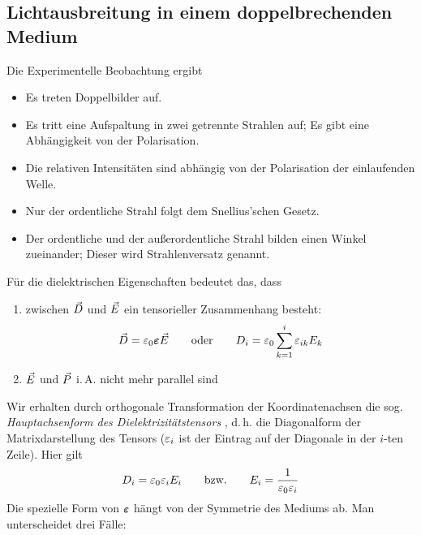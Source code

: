 \subsection{Lichtausbreitung in einem doppelbrechenden Medium}
Die Experimentelle Beobachtung ergibt
\begin{itemize}
\item Es treten Doppelbilder auf.
\item Es tritt eine Aufspaltung in zwei getrennte Strahlen auf; Es
  gibt eine Abhängigkeit von der Polarisation.
\item Die relativen Intensitäten sind abhängig von der Polarisation
  der einlaufenden Welle.
\item Nur der ordentliche Strahl folgt dem Snellius'schen Gesetz.
\item Der ordentliche und der außerordentliche Strahl bilden einen
  Winkel zueinander; Dieser wird
  Strahlenversatz genannt.
\end{itemize}
Für die dielektrischen Eigenschaften bedeutet das, dass
\begin{enumerate}
\item zwischen $\vec{D}$ und $\vec{E}$ ein tensorieller Zusammenhang
  besteht:
  \begin{gather*}
    \vec{D}=\varepsilon_0\boldsymbol{\varepsilon}\vec{E}
    \qquad\text{oder}\qquad
    D_i = \varepsilon_0\sum_{k=1}^i \varepsilon_{ik}E_k
  \end{gather*}%
\item $\vec{E}$ und $\vec{P}$ i.\,A. nicht mehr parallel sind
\end{enumerate}
Wir erhalten durch orthogonale Transformation der Koordinatenachsen die
sog. \emph{Hauptachsenform des Dielektrizitätstensors}%
,
d.\,h. die Diagonalform der Matrixdarstellung des Tensors 
($\varepsilon_i$%
ist der Eintrag auf der Diagonale in der $i$-ten Zeile). Hier gilt
\begin{gather*}
  D_i = \varepsilon_0\varepsilon_iE_i
  \qquad\text{bzw.}\qquad
  E_i = \frac{1}{\varepsilon_0\varepsilon_i}
\end{gather*}%
Die spezielle Form von $\boldsymbol{\varepsilon}$ hängt von der Symmetrie des Mediums ab.
Man unterscheidet drei Fälle:
